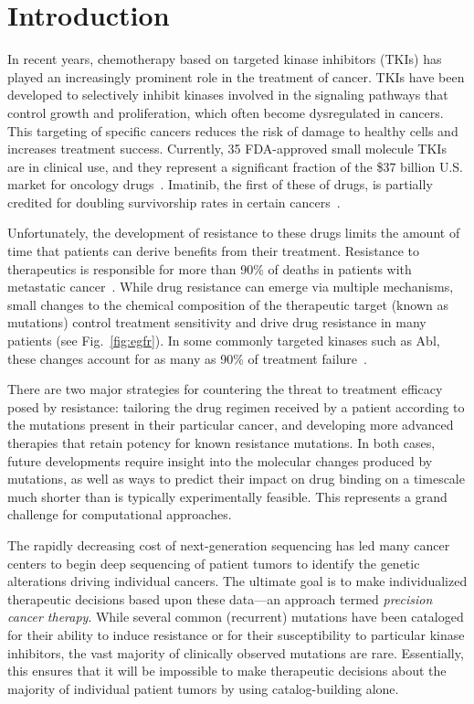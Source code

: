 \documentclass[conference]{IEEEtran}
\begin{document}
%
%
%
\section{Introduction}\label{sec:intro}
%
%
%
%

In recent years, chemotherapy based on targeted kinase inhibitors (TKIs) has
played an increasingly prominent role in the treatment of cancer.
%
%
%
TKIs have been developed to selectively inhibit kinases involved in the
signaling pathways that control growth and proliferation, which often become
dysregulated in cancers. This targeting of specific cancers reduces the risk
of damage to healthy cells and increases treatment success. Currently,
35 FDA-approved small molecule TKIs are in clinical use, and they represent a
significant fraction of the \$37 billion U.S. market for oncology
drugs~\cite{FDA, Zhao2014}. Imatinib, the first of these of drugs, is
partially credited for doubling survivorship rates in certain
cancers~\cite{Zhao2014, ACSreport}.

Unfortunately, the development of resistance to these drugs limits the amount
of time that patients can derive benefits from their treatment. Resistance to
therapeutics is responsible for more than 90\% of deaths in patients with
metastatic cancer~\cite{Longley2005}. While drug resistance can emerge via
multiple mechanisms, small changes to the chemical composition of the
therapeutic target (known as mutations) control treatment sensitivity and
drive drug resistance in many patients (see Fig.~\ref{fig:egfr}). In some
commonly targeted kinases such as Abl, these changes account for as many as
90\% of treatment failure~\cite{Shah2002}.

%
%
%
%
%
%
%
%
%

There are two major strategies for countering the threat to treatment
efficacy posed by resistance: tailoring the drug regimen received by a
patient according to the mutations present in their particular cancer, and
developing more advanced %
therapies that retain potency for known resistance mutations. In both cases,
future developments require insight into the molecular changes produced by
mutations, as well as ways to predict their impact on drug binding on a
timescale much shorter than is typically experimentally feasible. This
represents a grand challenge for computational approaches.

The rapidly decreasing cost of next-generation sequencing has led many cancer
centers to begin deep sequencing of patient tumors to identify the genetic
alterations driving individual cancers. The ultimate goal is to make
individualized therapeutic decisions based upon these data---an approach
termed \textit{precision cancer therapy}. While several common (recurrent)
mutations have been cataloged for their ability to induce resistance or for
their susceptibility to particular kinase inhibitors, the vast majority of
clinically observed mutations are rare. Essentially, this ensures that it
will be impossible to make therapeutic decisions about the majority of
individual patient tumors by using catalog-building alone.
\end{document}
